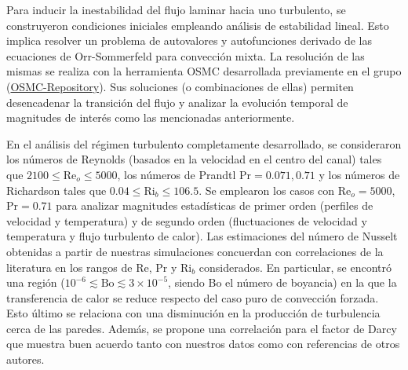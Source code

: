 \begin{resumen}
Para inducir la inestabilidad del flujo laminar hacia uno turbulento, se construyeron condiciones iniciales empleando análisis de estabilidad lineal. Esto implica resolver un problema de autovalores y autofunciones derivado de las ecuaciones de Orr-Sommerfeld para convección mixta. La resolución de las mismas se realiza con la herramienta OSMC desarrollada previamente en el grupo (\href{[https://github.com/Pato4184/OSMC-Repository}{OSMC-Repository}). Sus soluciones (o combinaciones de ellas) permiten desencadenar la transición del flujo y analizar la evolución temporal de magnitudes de interés como las mencionadas anteriormente.

En el análisis del régimen turbulento completamente desarrollado, se consideraron los números de Reynolds (basados en la velocidad en el centro del canal) tales que $ 2100 \leq \text{Re}_o \leq 5000$, los números de Prandtl $\text{Pr}=0\text{.}071,0\text{.}71$ y los números de \linebreak Richardson tales que $0\text{.}04 \leq \text{Ri}_b \leq 106\text{.}5$. Se emplearon los casos con $\text{Re}_o =5000$, $\text{Pr}=0\text{.}71$ para analizar magnitudes estadísticas de primer orden (perfiles de velocidad y temperatura) y de segundo orden (fluctuaciones de velocidad y temperatura y flujo turbulento de calor). Las estimaciones del número de Nusselt obtenidas a partir de nuestras \linebreak simulaciones concuerdan con correlaciones de la literatura en los rangos de Re, Pr y $\text{Ri}_b$ considerados. En particular, se encontró una región ($10^{-6} \lesssim \text{Bo} \lesssim 3 \times 10^{-5}$, siendo Bo el número de boyancia) en la que la transferencia de calor se reduce respecto del caso puro de convección forzada. Esto último se relaciona con una disminución en la producción de turbulencia cerca de las paredes. Además, se propone una correlación para el factor de Darcy que muestra buen acuerdo tanto con nuestros datos como con referencias de otros autores.


\end{resumen}
